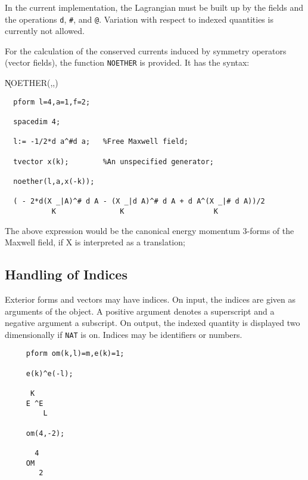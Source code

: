 In the current implementation, the Lagrangian must be built up by the
fields and the operations {\tt d}, {\tt \#}, and {\tt @}. Variation
with respect to indexed quantities is currently not allowed.

For the calculation of the conserved currents induced by symmetry
operators (vector fields), the function {\tt NOETHER}\label{NOETHER}
is provided.  It has the syntax:

\hspace*{2em}
\k{NOETHER}(,,)

\example{}
\begin{verbatim}
  pform l=4,a=1,f=2;

  spacedim 4;

  l:= -1/2*d a^#d a;   %Free Maxwell field;

  tvector x(k);        %An unspecified generator;

  noether(l,a,x(-k));

  ( - 2*d(X _|A)^# d A - (X _|d A)^# d A + d A^(X _|# d A))/2
           K               K                     K
\end{verbatim}

The above expression would be the canonical energy
momentum 3-forms of the Maxwell field, if X is interpreted
as a translation;



\subsection{Handling of Indices}
Exterior forms and vectors may have indices.  On input, the indices
are given as arguments of the object.  A positive argument denotes a
superscript and a negative argument a subscript.  On output, the
indexed quantity is displayed two dimensionally if \texttt{NAT} is on.
Indices may be identifiers or numbers.  

\example{}

\begin{verbatim}
     pform om(k,l)=m,e(k)=1;

     e(k)^e(-l);

      K
     E ^E
         L

     om(4,-2);

       4
     OM
        2
\end{verbatim}

